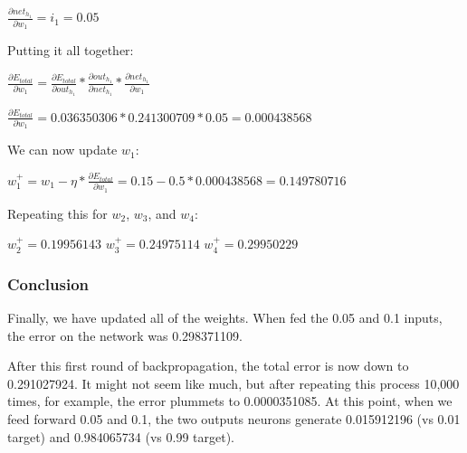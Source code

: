 \documentclass[a4paper]{article}
\begin{document}
$\frac{\partial net_{h_1}}{\partial w_1} = i_1=0.05$

\bigskip
Putting it all together:

$\frac{\partial E_{total}}{\partial w_1} = \frac{\partial E_{total}}{\partial out_{h_1}} * \frac{\partial out_{h_1}}{\partial net_{h_1}} * \frac{\partial net_{h_1}}{\partial w_1}$

$\frac{\partial E_{total}}{\partial w_1} = 0.036350306*0.241300709*0.05=0.000438568$

We can now update $w_1$:

$w_1^+=w_1-\eta * \frac{\partial E_{total}}{\partial w_1} = 0.15-0.5*0.000438568=0.149780716$

Repeating this for $w_2$, $w_3$, and $w_4$:

$w_2^+=0.19956143$
$w_3^+=0.24975114$
$w_4^+=0.29950229$

\subsubsection{Conclusion}
Finally, we have updated all of the weights. When fed the 0.05 and 0.1 inputs, the error on the network was 0.298371109.

After this first round of backpropagation, the total error is now down to 0.291027924. It might not seem like much, but after repeating this process 10,000 times, for example, the error plummets to 0.0000351085. At this point, when we feed forward 0.05 and 0.1, the two outputs neurons generate 0.015912196 (vs 0.01 target) and 0.984065734 (vs 0.99 target).




\end{document}
